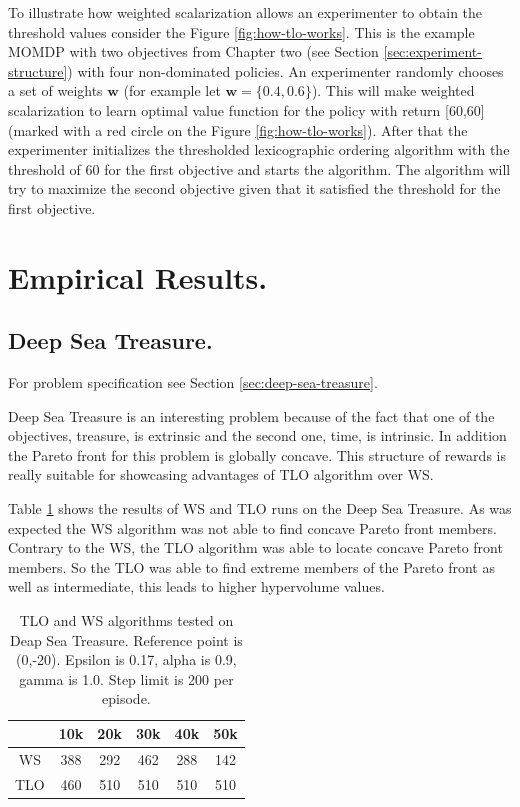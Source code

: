 To illustrate how weighted scalarization allows an experimenter to obtain the threshold values consider the Figure \ref{fig:how-tlo-works}. This is the example MOMDP with two objectives from Chapter two (see Section \ref{sec:experiment-structure}) with four non-dominated policies. An experimenter randomly chooses a set of weights $ \textbf{w} $ (for example let $ \textbf{w} = \{0.4,0.6\} $). This will make weighted scalarization to learn optimal value function for the policy with return [60,60] (marked with a red circle on the Figure \ref{fig:how-tlo-works}). After that the experimenter initializes the thresholded lexicographic ordering algorithm with the threshold of 60 for the first objective and starts the algorithm. The algorithm will try to maximize the second objective given that it satisfied the threshold for the first objective.

\section{Empirical Results.}

\subsection{Deep Sea Treasure.}
For problem specification see Section \ref{sec:deep-sea-treasure}.

Deep Sea Treasure is an interesting problem because of the fact that one of the objectives, treasure, is extrinsic and the second one, time, is intrinsic. In addition the Pareto front for this problem is globally concave. This structure of rewards is really suitable for showcasing advantages of TLO algorithm over WS.

Table \ref{tab:deep-sea-treasure} shows the results of WS and TLO runs on the Deep Sea Treasure. As was expected the WS algorithm was not able to find concave Pareto front members. Contrary to the WS, the TLO algorithm was able to locate concave Pareto front members. So the TLO was able to find extreme members of the Pareto front as well as intermediate, this leads to higher hypervolume values.

\begin{table}[t]
\centering
\def\arraystretch{1.5}
\begin{tabular}{|c|c|c|c|c|c|}
  \hline
  & 10k & 20k & 30k & 40k & 50k \\
  \hline
  WS & 388 & 292 & 462 & 288 & 142 \\
  \hline
  TLO & 460 & 510 & 510 & 510 & 510 \\
  \hline
\end{tabular}
\caption{TLO and WS algorithms tested on Deap Sea Treasure. Reference point is (0,-20). Epsilon is 0.17, alpha is 0.9, gamma is 1.0. Step limit is 200 per episode.}
\label{tab:deep-sea-treasure}
\end{table}

